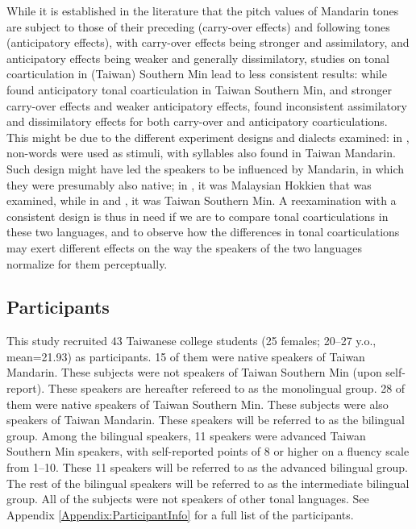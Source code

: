 \documentclass[12pt]{report}
\begin{document}
\begin{CJK}{UTF8}{bsmi}
While it is established in the literature that the pitch values of Mandarin tones are subject to those of their preceding (carry-over effects) and following tones (anticipatory effects), with carry-over effects being stronger and assimilatory, and anticipatory effects being weaker and generally dissimilatory, studies on tonal coarticulation in (Taiwan) Southern Min lead to less consistent results: while \cite{Peng1997} found anticipatory tonal coarticulation in Taiwan Southern Min, and \cite{Wang2002} stronger carry-over effects and weaker anticipatory effects, \cite{ChangHsieh2012} found inconsistent assimilatory and dissimilatory effects for both carry-over and anticipatory coarticulations. This might be due to the different experiment designs and dialects examined: in \cite{Wang2002}, non-words were used as stimuli, with syllables also found in Taiwan Mandarin. Such design might have led the speakers to be influenced by Mandarin, in which they were presumably also native; in \cite{ChangHsieh2012}, it was Malaysian Hokkien that was examined, while in \cite{Peng1997} and \cite{Wang2002}, it was Taiwan Southern Min. A reexamination with a consistent design is thus in need if we are to compare tonal coarticulations in these two languages, and to observe how the differences in tonal coarticulations may exert different effects on the way the speakers of the two languages normalize for them perceptually.

\subsection{Participants}

This study recruited 43 Taiwanese college students (25 females; 20–27 y.o., mean=21.93) as participants. 15 of them were native speakers of Taiwan Mandarin. These subjects were not speakers of Taiwan Southern Min (upon self-report). These speakers are hereafter refereed to as the monolingual group. 28 of them were native speakers of Taiwan Southern Min. These subjects were also speakers of Taiwan Mandarin. These speakers will be referred to as the bilingual group. Among the bilingual speakers, 11 speakers were advanced Taiwan Southern Min speakers, with self-reported points of 8 or higher on a fluency scale from 1–10. These 11 speakers will be referred to as the advanced bilingual group. The rest of the bilingual speakers will be referred to as the intermediate bilingual group. All of the subjects were not speakers of other tonal languages. See Appendix \ref{Appendix:ParticipantInfo} for a full list of the participants. 


\end{CJK}
\end{document}
